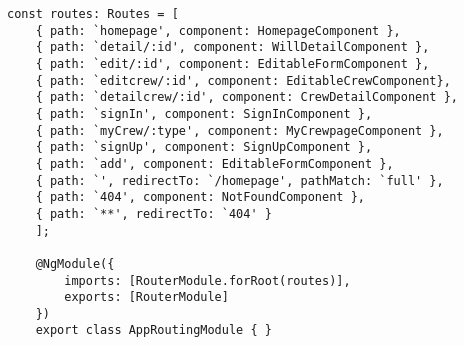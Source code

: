 \begin{lstlisting}[style=Java, caption = {Implementazione del \textit{pattern} \textit{Lazy loading} nel \texttt{AppRoutingModule}}]
const routes: Routes = [
    { path: `homepage', component: HomepageComponent },
    { path: `detail/:id', component: WillDetailComponent },
    { path: `edit/:id', component: EditableFormComponent },
    { path: `editcrew/:id', component: EditableCrewComponent},
    { path: `detailcrew/:id', component: CrewDetailComponent },
    { path: `signIn', component: SignInComponent },
    { path: `myCrew/:type', component: MyCrewpageComponent },
    { path: `signUp', component: SignUpComponent },
    { path: `add', component: EditableFormComponent },
    { path: `', redirectTo: `/homepage', pathMatch: `full' },
    { path: `404', component: NotFoundComponent },
    { path: `**', redirectTo: `404' }
    ];
    
    @NgModule({
        imports: [RouterModule.forRoot(routes)],
        exports: [RouterModule]
    })
    export class AppRoutingModule { }  
\end{lstlisting}